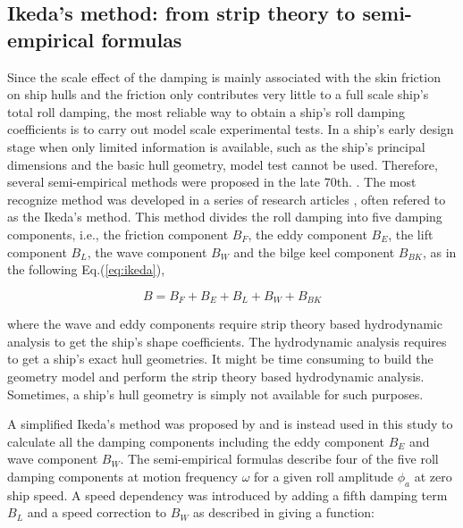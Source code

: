 
\subsection{Ikeda's method: from strip theory to semi-empirical formulas}
\label{se:semi-empirical methods}
Since the scale effect of the damping is mainly associated with the skin friction on ship hulls and the friction only contributes very little to a full scale ship's total roll damping, the most reliable way to obtain a ship's roll damping coefficients is to carry out model scale experimental tests. 
In a ship's early design stage when only limited information is available, such as the ship's principal dimensions and the basic hull geometry, model test cannot be used. Therefore, several semi-empirical methods were proposed in the late 70th.  \parencite{himeno_prediction_1981}. The most recognize method was developed in a series of research articles \parencite{ikeda_roll_1978,ikeda_eddy_1978,ikeda_roll_1979,ikeda_components_1978,ikeda_velocity_1979}, often refered to as the Ikeda's method. This method divides the roll damping into five damping components, i.e., the friction component $B_F$, the eddy component $B_E$, the lift component $B_L$, the wave component $B_W$ and the bilge keel component $B_{BK}$, as in the following Eq.(\ref{eq:ikeda}), 

\begin{equation} \label{eq:ikeda}
B = B_F + B_E + B_L + B_W + B_{BK}
\end{equation}

where the wave and eddy components require strip theory based hydrodynamic analysis to get the ship's shape coefficients. The hydrodynamic analysis requires to get a ship's exact hull geometries. It might be time consuming to build the geometry model and perform the strip theory based hydrodynamic analysis. Sometimes, a ship's hull geometry is simply not available for such purposes. 

A simplified Ikeda's method was proposed by \parencite{kawahara_simple_2011} and is instead used in this study to calculate all the damping components including the eddy component $B_E$ and wave component $B_W$. The semi-empirical formulas describe four of the five roll damping components at motion frequency $\omega$ for a given roll amplitude $\phi_a$ at zero ship speed. A speed dependency was introduced by adding a fifth damping term $B_L$ and a speed correction to $B_W$ as described in \parencite{ikeda_velocity_1979} giving a function: 




